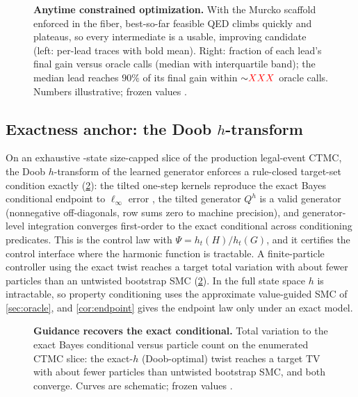 \documentclass{article}
\theoremstyle{definition}
\theoremstyle{remark}
\begin{document}
\begin{figure}[t]
\centering
{}
\caption{\textbf{Anytime constrained optimization.} With the Murcko scaffold enforced in the fiber, best-so-far feasible QED climbs quickly and plateaus, so every intermediate is a usable, improving candidate (left: per-lead traces with bold mean). Right: fraction of each lead's final gain versus oracle calls (median with interquartile band); the median lead reaches $90\%$ of its final gain within ${\sim}\textcolor{red}{XXX}{}$ oracle calls. Numbers illustrative; frozen values \XXX.}
\label{fig:anytime}
\end{figure}

\subsection{Exactness anchor: the Doob \texorpdfstring{$h$}{h}-transform}
\label{sec:exactness}

On an exhaustive \ComposeExactnessStates{}-state size-capped slice of the production legal-event CTMC, the Doob $h$-transform of the learned generator enforces a rule-closed target-set condition exactly (\cref{fig:doob}): the tilted one-step kernels reproduce the exact Bayes conditional endpoint to $\ell_\infty$ error \ComposeExactnessLinf{}, the tilted generator $Q^h$ is a valid generator (nonnegative off-diagonals, row sums zero to machine precision), and generator-level integration converges first-order to the exact conditional across conditioning predicates. This is the control law with $\Psi=h_t(H)/h_t(G)$, and it certifies the control interface where the harmonic function is tractable. A finite-particle controller using the exact twist reaches a target total variation with about \ExactHParticleFactor{} fewer particles than an untwisted bootstrap SMC (\cref{fig:doob}). In the full state space $h$ is intractable, so property conditioning uses the approximate value-guided SMC of \cref{sec:oracle}, and \cref{cor:endpoint} gives the endpoint law only under an exact model.

\begin{figure}[t]
\centering
{}
\caption{\textbf{Guidance recovers the exact conditional.} Total variation to the exact Bayes conditional versus particle count on the enumerated CTMC slice: the exact-$h$ (Doob-optimal) twist reaches a target TV with about \ExactHParticleFactor{} fewer particles than untwisted bootstrap SMC, and both converge. Curves are schematic; frozen values \XXX.}
\label{fig:doob}
\end{figure}
\end{document}
